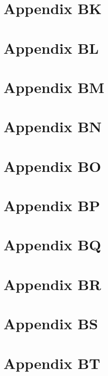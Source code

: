 \chapter{Appendix BK}

\chapter{Appendix BL}

\chapter{Appendix BM}

\chapter{Appendix BN}

\chapter{Appendix BO}

\chapter{Appendix BP}

\chapter{Appendix BQ}

\chapter{Appendix BR}

\chapter{Appendix BS}

\chapter{Appendix BT}

